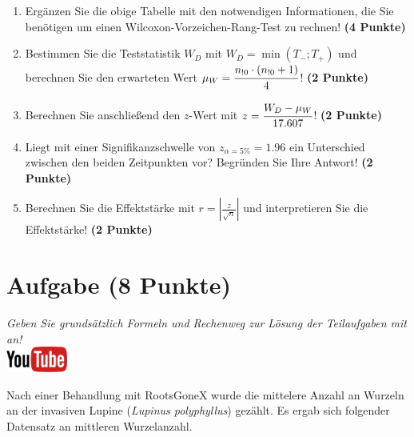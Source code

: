 \documentclass[a4paper, 9pt]{scrartcl}\usepackage[]{graphicx}\usepackage[]{xcolor}
\begin{document}
\begin{enumerate}
\item Erg{\"a}nzen Sie die obige Tabelle mit den notwendigen Informationen, die
  Sie ben{\"o}tigen um einen Wilcoxon-Vorzeichen-Rang-Test zu rechnen!
  \textbf{(4 Punkte)}
\item Bestimmen Sie die Teststatistik $W_D$ mit $W_D = \min(T_{-}; T_{+})$ und
  berechnen Sie den erwarteten Wert $\mu_W = \cfrac{n_{!0} \cdot (n_{!0} + 1)}{4}$!
  \textbf{(2 Punkte)}
\item Berechnen Sie anschlie{\ss}end den $z$-Wert mit $z = \cfrac{W_D -
    \mu_W}{17.607}$! \textbf{(2 Punkte)}
\item Liegt mit einer Signifikanzschwelle von $z_{\alpha = 5\%} =
  1.96$ ein Unterschied zwischen den beiden Zeitpunkten vor? Begr{\"u}nden Sie
  Ihre Antwort! \textbf{(2 Punkte)} 
\item Berechnen Sie die Effektst{\"a}rke mit $r = |\frac{z}{\sqrt{n}}| $ und
  interpretieren Sie die Effektst{\"a}rke! \textbf{(2 Punkte)} 
\end{enumerate} 
\clearpage

\section{Aufgabe \hfill (8 Punkte)}

\textit{Geben Sie grunds{\"a}tzlich Formeln und Rechenweg zur L{\"o}sung der
  Teilaufgaben mit an!} \\[1Ex]

\hfill\href{https://youtu.be/5tiJFxuZcco}{\includegraphics[width =
  2cm]{img/youtube}} %
\hspace{2Ex}




Nach einer Behandlung mit RootsGoneX wurde die mittelere Anzahl an Wurzeln
an der invasiven Lupine (\textit{Lupinus polyphyllus}) gez{\"a}hlt. Es ergab sich
folgender Datensatz an mittleren Wurzelanzahl.
\end{document}
